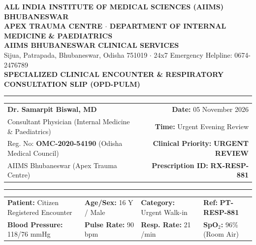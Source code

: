 \documentclass[9pt,a4paper]{article}
\begin{document}
\begin{tcolorbox}[
    colback=white,
    colframe=primary,
    arc=3mm,
    boxrule=1.5pt,
    left=8pt, right=8pt, top=5pt, bottom=5pt
]

\begin{center}
    {\scriptsize\textbf{\color{primarydark}ALL INDIA INSTITUTE OF MEDICAL SCIENCES (AIIMS) BHUBANESWAR}}\\[1pt]
    {\scriptsize\textbf{\color{accent}APEX TRAUMA CENTRE $\cdot$ DEPARTMENT OF INTERNAL MEDICINE \& PAEDIATRICS}}\\[2pt]
    {\Large\textbf{\color{primary}AIIMS BHUBANESWAR CLINICAL SERVICES}}\\[1pt]
    {\footnotesize Sijua, Patrapada, Bhubaneswar, Odisha 751019 $\cdot$ 24x7 Emergency Helpline: 0674-2476789}\\[1pt]
    {\scriptsize\textbf{SPECIALIZED CLINICAL ENCOUNTER \& RESPIRATORY CONSULTATION SLIP (OPD-PULM)}}
\end{center}

\vspace{-6pt}
\noindent\textcolor{primary}{\rule{\linewidth}{1.2pt}}

\vspace{1pt}
\begin{tabularx}{\linewidth}{@{}Xr@{}}
    \textbf{\large Dr. Samarpit Biswal, MD} & \textbf{Date:} 05 November 2026 \\
    Consultant Physician (Internal Medicine \& Paediatrics) & \textbf{Time:} Urgent Evening Review \\
    Reg. No: \textbf{\color{primarydark}OMC-2020-54190} (Odisha Medical Council) & \textbf{Clinical Priority:} \textbf{\color{primary}URGENT REVIEW} \\
    AIIMS Bhubaneswar (Apex Trauma Centre) & \textbf{Prescription ID:} \textbf{\color{accent}RX-RESP-881} \\
\end{tabularx}

\vspace{1pt}
\noindent\textcolor{linegray}{\rule{\linewidth}{0.6pt}}

\vspace{1pt}
\begin{tcolorbox}[colback=lightgray, colframe=linegray, arc=2mm, boxrule=0.5pt, left=6pt, right=6pt, top=3pt, bottom=3pt]
    \begin{tabularx}{\linewidth}{@{}p{3.8cm}p{2.6cm}p{3.2cm}X@{}}
        \textbf{Patient:} Citizen Registered Encounter & \textbf{Age/Sex:} 16 Y / Male & \textbf{Category:} Urgent Walk-in & \textbf{Ref:} \textbf{PT-RESP-881} \\
        \textbf{Blood Pressure:} 118/76 mmHg & \textbf{Pulse Rate:} 90 bpm & \textbf{Resp. Rate:} 21 /min & \textbf{SpO$_2$:} 96\% (Room Air) \\
    \end{tabularx}
\end{tcolorbox}


\end{tcolorbox}
\end{document}
